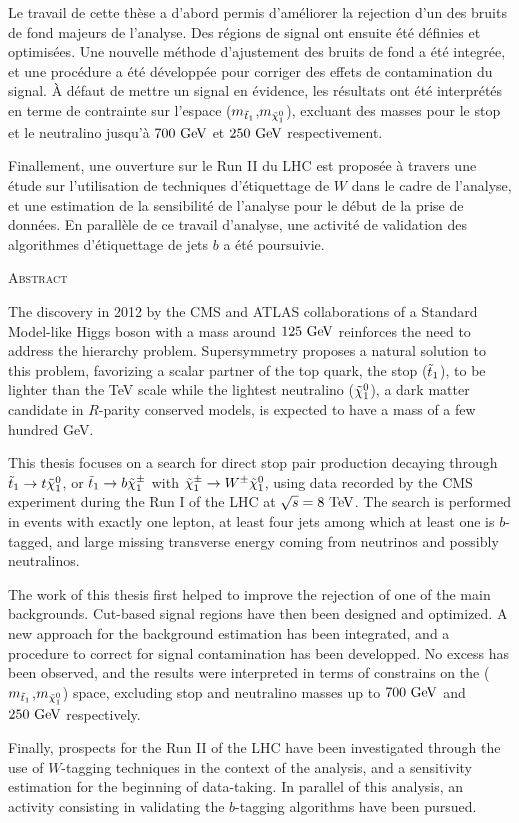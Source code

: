     Le travail de cette thèse a d'abord permis d'améliorer la rejection d'un des bruits
de fond majeurs de l'analyse. Des régions de signal ont ensuite été définies et optimisées.
Une nouvelle méthode d'ajustement des bruits de fond a été integrée, et une procédure a été développée pour corriger des effets de contamination
du signal. À défaut de mettre un signal en évidence, les résultats ont été interprétés en
terme de contrainte sur l'espace ($m_{\tilde{t}_1}$,$m_{\tilde{\chi}_1^0}$), excluant des masses
pour le stop et le neutralino jusqu'à $700~\text{GeV}$ et $250~\text{GeV}$ respectivement.

    Finallement, une ouverture sur le Run II du LHC est proposée à travers une étude sur
l'utilisation de techniques d'étiquettage de $W$ dans le cadre de l'analyse, et une
estimation de la sensibilité de l'analyse pour le début de la prise de données. En parallèle
de ce travail d'analyse, une activité de validation des algorithmes d'étiquettage de jets $b$
a été poursuivie.

\begin{center}\textsc{Abstract}\end{center}
    \vspace*{-0.2cm}
    The discovery in 2012 by the CMS and ATLAS collaborations of a Standard Model-like Higgs boson
with a mass around $125~\text{GeV}$ reinforces the need to address the hierarchy problem. Supersymmetry
proposes a natural solution to this problem, favorizing a scalar partner of the top quark,
the stop ($\tilde{t}_1$), to be lighter than the TeV scale while the lightest neutralino
($\tilde{\chi}_1^0$), a dark matter candidate in $R$-parity conserved models, is expected to have
a mass of a few hundred GeV.

    This thesis focuses on a search for direct stop pair production decaying through
$\tilde{t}_1 \rightarrow t \tilde{\chi}_1^0$, or $\tilde{t}_1 \rightarrow b \tilde{\chi}_1^\pm$ with
$\tilde{\chi}_1^\pm \rightarrow W^\pm \tilde{\chi}_1^0$, using data recorded by the CMS experiment during
the Run I of the LHC at $\sqrt{s} = 8~\text{TeV}$. The search is performed in events with exactly
one lepton, at least four jets among which at least one is $b$-tagged, and large missing
transverse energy coming from neutrinos and possibly neutralinos.

    The work of this thesis first helped to improve the rejection of one of the main backgrounds.
Cut-based signal regions have then been designed and optimized. A new approach for the background
estimation has been integrated, and a procedure to correct for signal contamination has
been developped. No excess has been observed, and the results were interpreted in terms of
constrains on the ($m_{\tilde{t}_1}$,$m_{\tilde{\chi}_1^0}$) space, excluding stop and neutralino
masses up to $700~\text{GeV}$ and $250~\text{GeV}$ respectively.

    Finally, prospects for the Run II of the LHC have been investigated through the use of
$W$-tagging techniques in the context of the analysis, and a sensitivity estimation for the
beginning of data-taking. In parallel of this analysis, an activity consisting in validating
the $b$-tagging algorithms have been pursued.
